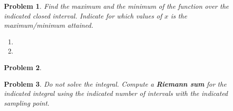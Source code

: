 \documentclass[12pt]{article}
\newtheorem{problem}{Problem}
\renewcommand{\fcProblemRef}{\theproblem.\theenumi}
\begin{document}
\begin{problem}Find the maximum and the minimum of the function over the indicated closed interval. Indicate for which values of $x$ is the maximum/minimum attained.
\begin{enumerate}[ref={\fcProblemRef}]
\item  
\item 
\end{enumerate}
\end{problem}


\begin{problem}

\end{problem}


\begin{problem}
{\sc Do not solve the integral. } Compute a \textbf{Riemann sum} for the indicated integral using the indicated number of intervals with the indicated sampling point. 

\end{problem}

\end{document}
